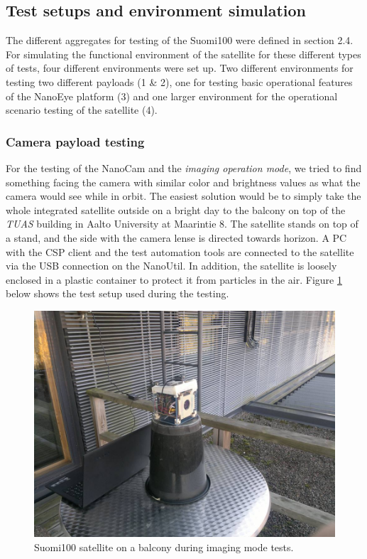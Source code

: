 \documentclass[english,12pt,a4paper,pdftex,elec,utf8]{aaltothesis}
\begin{document}
\subsection{Test setups and environment simulation}
The different aggregates for testing of the Suomi100 were defined in section 2.4. For simulating the functional environment of the satellite for these different types of tests, four different environments were set up. Two different environments for testing two different payloads (1 \& 2), one for testing basic operational features of the NanoEye platform (3) and one larger environment for the operational scenario testing of the satellite (4). 
\subsubsection{Camera payload testing}
For the testing of the NanoCam and the \textit{imaging operation mode}, we tried to find something facing the camera with similar color and brightness values as what the camera would see while in orbit. The easiest solution would be to simply take the whole integrated satellite outside on a bright day to the balcony on top of the \textit{TUAS} building in Aalto University at Maarintie 8. The satellite stands on top of a stand, and the side with the camera lense is directed towards horizon. A PC with the CSP client and the test automation tools are connected to the satellite via the USB connection on the NanoUtil. In addition, the satellite is loosely enclosed in a plastic container to protect it from particles in the air. 
Figure \ref{camerabalcony} below shows the test setup used during the testing.\par 
\begin{figure}[h!]
\centering
\includegraphics[scale=0.3]{camerabucketspurgu}
\caption{Suomi100 satellite on a balcony during imaging mode tests.}
\label{camerabalcony}
\end{figure} 
\end{document}
